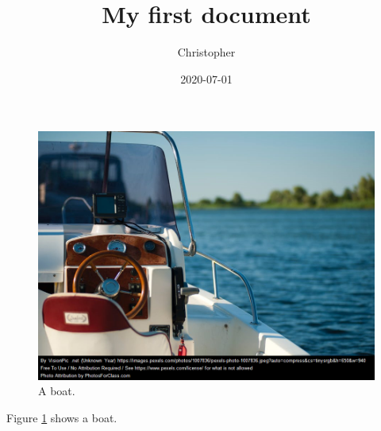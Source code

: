 \documentclass{article}
\title{My first document}
\date{2020-07-01}
\author{Christopher}
\begin{document}
	
	\begin{figure}[h!]
		\includegraphics[width=\linewidth]{boat.png}
		\caption{A boat.}
		\label{fig:boat1}
	\end{figure}
	
	Figure \ref{fig:boat1} shows a boat.
	
\end{document}
